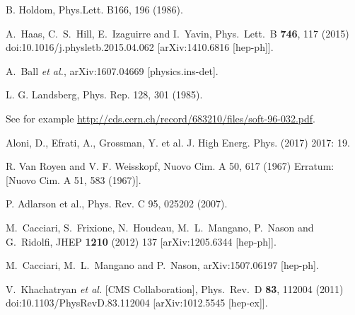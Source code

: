 \documentclass[12pt]{article}
\begin{document}
\begin{thebibliography}{1}


  B. Holdom, Phys.Lett. B166, 196 (1986).
  
  A.~Haas, C.~S.~Hill, E.~Izaguirre and I.~Yavin,
  Phys.\ Lett.\ B {\bf 746}, 117 (2015)
  doi:10.1016/j.physletb.2015.04.062
  [arXiv:1410.6816 [hep-ph]].

  A.~Ball {\it et al.},
  arXiv:1607.04669 [physics.ins-det].

  
  L. G. Landsberg, Phys. Rep. 128, 301 (1985). 

  See for example \href{http://cds.cern.ch/record/683210/files/soft-96-032.pdf}
{http://cds.cern.ch/record/683210/files/soft-96-032.pdf}.

Aloni, D., Efrati, A., Grossman, Y. et al. J. High Energ. Phys. (2017) 2017: 19. 

  R. Van Royen and V. F. Weisskopf, Nuovo Cim. A 50, 617 (1967) Erratum: [Nuovo Cim. A 51, 583 (1967)].

 P. Adlarson et al., Phys. Rev. C 95, 025202 (2007).

  M.~Cacciari, S.~Frixione, N.~Houdeau, M.~L.~Mangano, P.~Nason and G.~Ridolfi,
  JHEP {\bf 1210} (2012) 137 [arXiv:1205.6344 [hep-ph]].

  M.~Cacciari, M.~L.~Mangano and P.~Nason,
  arXiv:1507.06197 [hep-ph].

  V.~Khachatryan {\it et al.} [CMS Collaboration],
  Phys.\ Rev.\ D {\bf 83}, 112004 (2011)
  doi:10.1103/PhysRevD.83.112004
  [arXiv:1012.5545 [hep-ex]].


\end{thebibliography}
\end{document}
